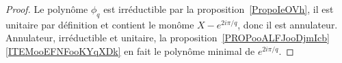 \begin{proof}
	Le polynôme \( \phi_q\) est irréductible par la proposition~\ref{PropoIeOVh}, il est unitaire par définition et contient le monôme \( X- e^{2i\pi/q}\), donc il est annulateur. Annulateur, irréductible et unitaire, la proposition~\ref{PROPooALFJooDjmIcb}\ref{ITEMooEFNFooKYqXDk} en fait le polynôme minimal de \(   e^{2i\pi/q}  \).
\end{proof}

%
